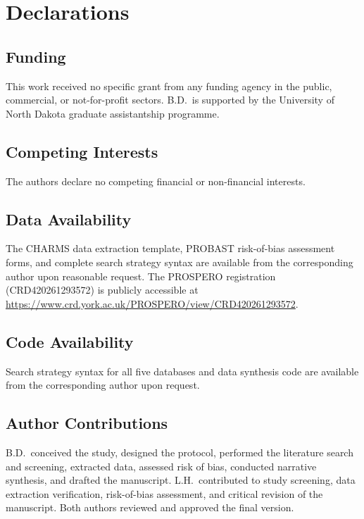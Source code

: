 \section*{Declarations}

\subsection*{Funding}
This work received no specific grant from any funding agency in the public, commercial, or not-for-profit sectors. B.D.\ is supported by the University of North Dakota graduate assistantship programme.

\subsection*{Competing Interests}
The authors declare no competing financial or non-financial interests.

\subsection*{Data Availability}
The CHARMS data extraction template, PROBAST risk-of-bias assessment forms, and complete search strategy syntax are available from the corresponding author upon reasonable request. The PROSPERO registration (CRD420261293572) is publicly accessible at \url{https://www.crd.york.ac.uk/PROSPERO/view/CRD420261293572}.

\subsection*{Code Availability}
Search strategy syntax for all five databases and data synthesis code are available from the corresponding author upon request.

\subsection*{Author Contributions}
B.D.\ conceived the study, designed the protocol, performed the literature search and screening, extracted data, assessed risk of bias, conducted narrative synthesis, and drafted the manuscript. L.H.\ contributed to study screening, data extraction verification, risk-of-bias assessment, and critical revision of the manuscript. Both authors reviewed and approved the final version.

